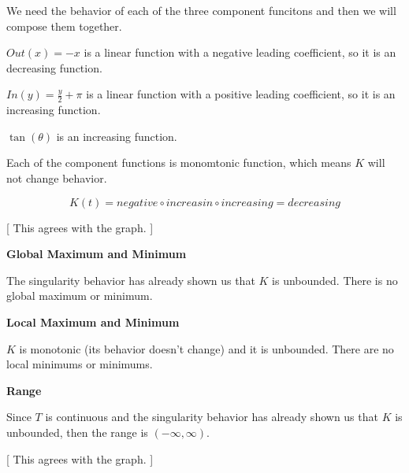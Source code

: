 \documentclass{ximera}
\begin{document}
{{We need the behavior of each of the three component funcitons and then we will compose them together. 




$Out(x) = -x$ is a linear function with a negative leading coefficient, so it is an decreasing function.


$In(y) = \frac{y}{2} + \pi$ is a linear function with a positive leading coefficient, so it is an increasing function.


$\tan(\theta)$ is an increasing function.


Each of the component functions is monomtonic function, which means $K$ will not change behavior. 



\[
K(t) = negative \circ increasin \circ increasing = decreasing
\]




[ This agrees with the graph. ]












\textbf{\textcolor{blue!55!black}{Global Maximum and Minimum}}


The singularity behavior has already shown us that $K$ is unbounded. There is no global maximum or minimum.  














\textbf{\textcolor{blue!55!black}{Local Maximum and Minimum}}


$K$ is monotonic (its behavior doesn't change) and it is unbounded.  There are no local minimums or minimums. 










\textbf{\textcolor{blue!55!black}{Range}}


Since $T$ is continuous and the singularity behavior has already shown us that $K$ is unbounded, then the range is $(-\infty, \infty)$. 



[ This agrees with the graph. ]













}}
\end{document}

